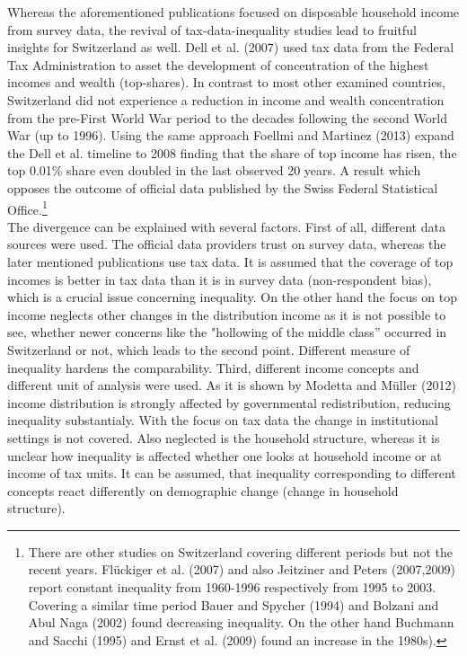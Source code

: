 
Whereas the aforementioned publications focused on disposable household income from survey data, the revival of tax-data-inequality studies lead to fruitful insights for Switzerland as well. Dell et al. (2007) used tax data from the Federal Tax Administration to asset the development of concentration of the highest incomes and wealth (top-shares). In contrast to most other examined countries, Switzerland did not experience a reduction in income and wealth concentration from the pre-First World War period to the decades following the second World War (up to 1996). Using the same approach Foellmi and Martinez (2013) expand the Dell et al. timeline to 2008 finding that the share of top income has risen, the top 0.01\% share even doubled in the last observed 20 years. A result which opposes the outcome of official data published by the Swiss Federal Statistical Office.\footnote{There are other studies on Switzerland covering different periods but not the recent years. Flückiger et al. (2007) and also Jeitziner and Peters (2007,2009) report constant inequality from 1960-1996 respectively from 1995 to 2003. Covering a similar time period Bauer and Spycher (1994) and Bolzani and Abul Naga (2002) found decreasing inequality. On the other hand Buchmann and Sacchi (1995) and Ernst et al. (2009) found an increase in the 1980s).} \\



The divergence can be explained with several factors. First of all, different data sources were used. The official data providers trust on survey data, whereas the later mentioned publications use tax data. It is assumed that the coverage of top incomes is better in tax data than it is in survey data (non-respondent bias), which is a crucial issue concerning inequality. On the other hand the focus on top income neglects other changes in the distribution income as it is not possible to see, whether newer concerns like the "hollowing of the middle class'' occurred in Switzerland or not, which leads to the second point. Different measure of inequality hardens the comparability. Third, different income concepts and different unit of analysis were used. As it is shown by Modetta and Müller (2012) income distribution is strongly affected by governmental redistribution, reducing inequality substantialy. With the focus on tax data the change in institutional settings is not covered. Also neglected is the household structure, whereas it is unclear how inequality is affected whether one looks at household income or at income of tax units. It can be assumed, that inequality corresponding to different concepts react differently on demographic change (change in household structure). \\

